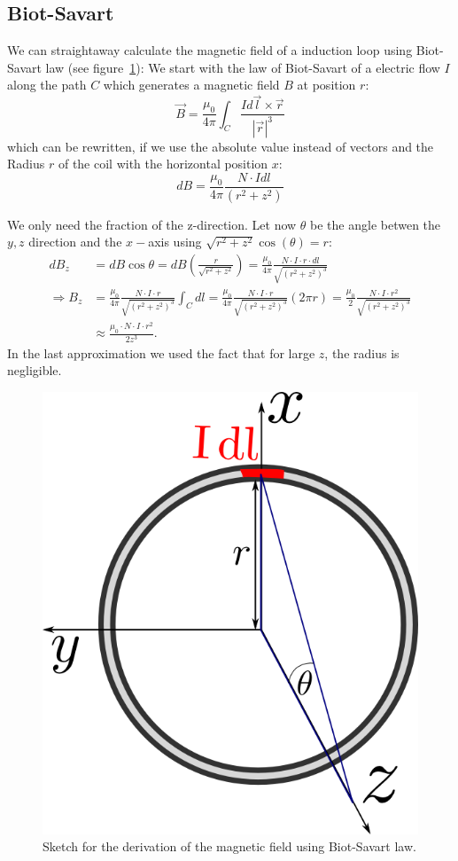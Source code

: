 \subsection{Biot-Savart}
We can straightaway calculate the magnetic field of a induction loop using
Biot-Savart law (see figure~\ref{fig:magnetic_field}):
We start with the law of Biot-Savart of a electric flow $I$ along the path $C$ which generates
a magnetic field $B$ at position $r$:
\begin{equation}
    \vec{B} = \frac{\mu_0}{4\pi} \int_{C} \frac{I d\vec{l} \times \vec{r}}{|\vec{r}|^3} 
\end{equation}
which can be rewritten, if we use the absolute value instead of vectors and the Radius $r$ of the
coil with the horizontal position $x$:
\begin{equation}
    dB = \frac{\mu_0}{4\pi} \frac{N \cdot I dl}{(r^2 + z^2)} 
\end{equation}

We only need the fraction of the z-direction. Let now $\theta$ be the angle betwen the $y,z$ 
direction and the $x-$axis using $\sqrt{{r}^2 + z^2} \cos(\theta) = {r}$:
\begin{align}
     dB_z &= dB \cos\theta = dB \left (\frac{{r}}{\sqrt{{r}^2 + z^2}} \right) = 
    \frac{\mu_0}{4\pi} \frac{N\cdot I  \cdot {r} \cdot dl}{\sqrt{\left ({r}^2 + z^2 \right )^3}} \\
\Rightarrow B_z &= \frac{\mu_0}{4\pi} \frac{N\cdot I  \cdot {r}}{\sqrt{\left ({r}^2 + z^2 \right )^3}} \int_C dl 
  = \frac{\mu_0}{4\pi} \frac{N\cdot I  \cdot {r}}{\sqrt{\left ({r}^2 + z^2 \right )^3}} \left (2\pi {r} \right )
  =  \frac{\mu_0}{2} \frac{N\cdot I  \cdot {r}^2}{\sqrt{\left ({r}^2 + z^2 \right )^3}} \\
  &\approx \frac{\mu_0\cdot N \cdot I \cdot r^2}{2z^3}. \label{eq:aprox1}
\end{align}
In the last approximation we used the fact that for large $z$, the
radius is negligible.
\begin{figure}[htpb]
    \centering
    \includegraphics[width=0.4\linewidth]{figures/magnetic_field}
    \caption{Sketch for the derivation of the magnetic field using Biot-Savart law.}
    \label{fig:magnetic_field}
\end{figure}
